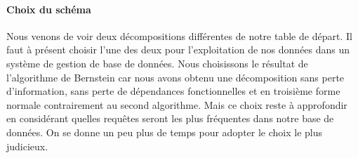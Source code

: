 \paragraph{Choix du schéma}{
    Nous venons de voir deux décompositions différentes de notre table de départ. Il faut à présent choisir l'une des deux pour l'exploitation de nos données dans un système de gestion de base de données. \newline
    Nous choisissons le résultat de l'algorithme de Bernstein car nous avons obtenu une décomposition sans perte d'information, sans perte de dépendances fonctionnelles et en troisième forme normale contrairement au second algorithme. Mais ce choix reste à approfondir en considérant quelles requêtes seront les plus fréquentes dans notre base de données. On se donne un peu plus de temps pour adopter le choix le plus judicieux. 
}